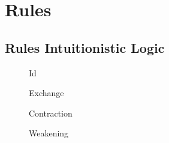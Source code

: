 \section{Rules}

\subsection{Rules Intuitionistic Logic}

\begin{figure}[!htb]
	\centering
	\begin{minipage}{0.3\textwidth}
		\centering

		\begin{prooftree}
			\tree%
			{} %
			{\mbox{Id}}
			{}
		\end{prooftree}

		\label{fig:id}
	\end{minipage}%
	\begin{minipage}{0.3\textwidth}
		\centering

		\begin{prooftree}
			\tree%
			{} %
			{\mbox{Exchange}}
			{
				\subtree[0px]{\judgement{\Gamma, \Delta}{A}}{}{}
			}
		\end{prooftree}

		\label{fig:exchange}
	\end{minipage}

	\vspace{1.5em} %

	\begin{minipage}{0.3\textwidth}
		\centering

		\begin{prooftree}
			\tree%
			{} %
			{\mbox{Contraction}}
			{
				\subtree[0px]{\judgement{\Gamma, A, A}{B}}{}{}
			}
		\end{prooftree}

		\label{fig:contraction}
	\end{minipage}%
	\begin{minipage}{0.3\textwidth}
		\centering

		\begin{prooftree}
			\tree%
			{} %
			{\mbox{Weakening}}
			{
				\subtree[0px]{\judgement{\Gamma}{B}}{}{}
			}
		\end{prooftree}

		\label{fig:weakening}
	\end{minipage}


\end{figure}

